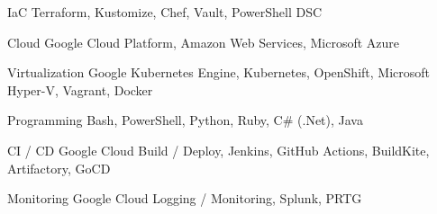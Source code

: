\textcolor{awesome}{\raisebox{0.2\height}{\faCode\thinspace}}

\begin{cvskills}

  \cvskill
    {IaC} %
    {Terraform, Kustomize, Chef, Vault, PowerShell DSC} %

  \cvskill
    {Cloud} %
    {Google Cloud Platform, Amazon Web Services, Microsoft Azure} %

  \cvskill
    {Virtualization} %
    {Google Kubernetes Engine, Kubernetes, OpenShift, Microsoft Hyper-V, Vagrant, Docker} %

  \cvskill
    {Programming} %
    {Bash, PowerShell, Python, Ruby, C\# (.Net), Java} %

  \cvskill
    {CI / CD} %
    {Google Cloud Build / Deploy, Jenkins, GitHub Actions, BuildKite, Artifactory, GoCD} %

  \cvskill
    {Monitoring} %
    {Google Cloud Logging / Monitoring, Splunk, PRTG} %

\end{cvskills}
